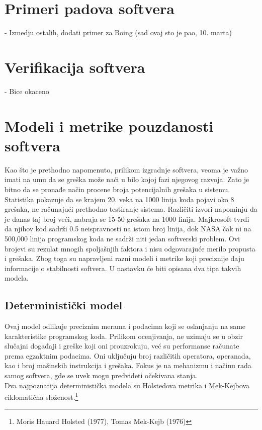 \documentclass[a4paper]{article}
\begin{document}
\section{Primeri padova softvera}
\label{sec:primeri}
- Izmedju ostalih, dodati primer za Boing (sad ovaj sto je pao, 10. marta) \\

\section{Verifikacija softvera}	
\label{sec:verifikacija}

- Bice okaceno

\section{Modeli i metrike pouzdanosti softvera}	
\label{sec:modeli_metrike}

Kao što je prethodno napomenuto, prilikom izgradnje softvera, veoma je važno imati na umu da se greška može naći u bilo kojoj fazi njegovog razvoja. Zato je bitno da se pronađe način procene broja potencijalnih grešaka u sistemu.\\
Statistika pokazuje da se krajem 20. veka na 1000 linija koda pojavi oko 8 grešaka, ne računajući prethodno testiranje sistema. Različiti izvori napominju da je danas taj broj veći, nabraja se 15-50 grešaka na 1000 linija. Majkrosoft tvrdi da njihov kod sadrži 0.5 neispravnosti na istom broj linija, dok NASA čak ni na 500,000 linija programskog koda ne sadrži niti jedan softverski problem. \cite{Statistika_prosek_gresaka} Ovi brojevi su rezulat mnogih spoljašnjih faktora i nisu odgovarajuće merilo propusta i grešaka. Zbog toga su napravljeni razni modeli i metrike koji preciznije daju informacije o stabilnosti softvera. U nastavku će biti opisana dva tipa takvih modela.\\


\subsection{Deterministički model}
\label{sec:deterministicki}

Ovaj model odlikuje preciznim merama i podacima koji se oslanjanju na same karakteristike programskog koda. Prilikom ocenjivanja, ne uzimaju se u obzir slučajni događaji i greške koji oni prouzrokuju, već su performanse računate prema egzaktnim podacima. Oni uključuju broj različitih operatora, operanada, kao i broj mašinskih instrukcija i grešaka. Fokus je na mehanizmu i načinu rada samog softvera, gde se uvek mogu predvideti očekivana stanja.\\
Dva najpoznatija deterministička modela su Holstedova metrika i Mek-Kejbova ciklomatična složenost.\footnote{Moris Hauard Holsted (1977), Tomas Mek-Kejb (1976)}
\end{document}
